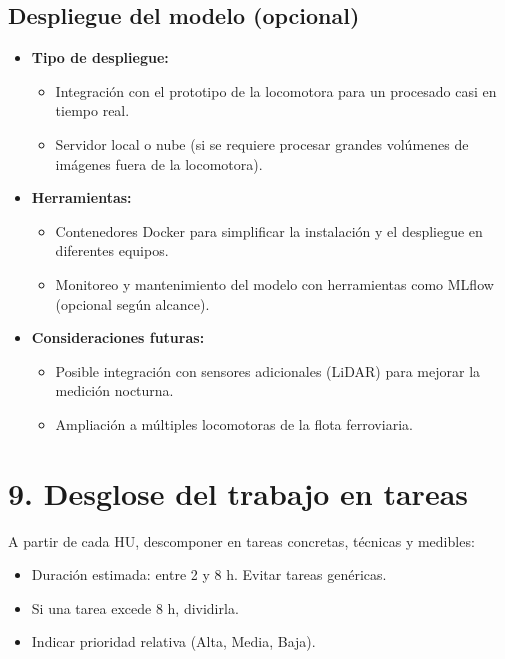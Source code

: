 \documentclass[
11pt, %
]{ProyectoVpC}
\begin{document}
\subsection{Despliegue del modelo (opcional)}
\begin{itemize}
  \item \textbf{Tipo de despliegue:} 
    \begin{itemize}
      \item Integración con el prototipo de la locomotora para un procesado casi en tiempo real.
      \item Servidor local o nube (si se requiere procesar grandes volúmenes de imágenes fuera de la locomotora).
    \end{itemize}
  \item \textbf{Herramientas:} 
    \begin{itemize}
      \item Contenedores Docker para simplificar la instalación y el despliegue en diferentes equipos.
      \item Monitoreo y mantenimiento del modelo con herramientas como MLflow (opcional según alcance).
    \end{itemize}
  \item \textbf{Consideraciones futuras:}
    \begin{itemize}
      \item Posible integración con sensores adicionales (LiDAR) para mejorar la medición nocturna.
      \item Ampliación a múltiples locomotoras de la flota ferroviaria.
    \end{itemize}
\end{itemize}

\section{9. Desglose del trabajo en tareas}
\label{sec:wbs}

A partir de cada HU, descomponer en tareas concretas, técnicas y medibles:

\begin{itemize}
  \item Duración estimada: entre 2 y 8 h. Evitar tareas genéricas.
  \item Si una tarea excede 8 h, dividirla.
  \item Indicar prioridad relativa (Alta, Media, Baja).
\end{itemize}
\end{document}

